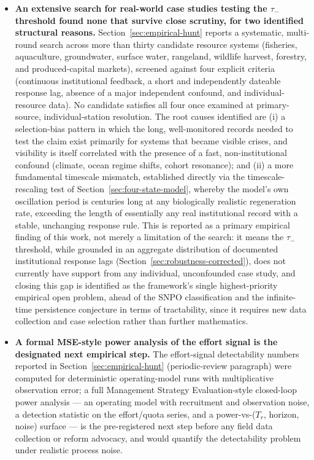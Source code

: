 \documentclass[twocolumn,10pt]{article}
\begin{document}
\begin{itemize}
\item \textbf{An extensive search for real-world case studies testing the $\tau_-$ threshold found none that survive close scrutiny, for two identified structural reasons.} Section~\ref{sec:empirical-hunt} reports a systematic, multi-round search across more than thirty candidate resource systems (fisheries, aquaculture, groundwater, surface water, rangeland, wildlife harvest, forestry, and produced-capital markets), screened against four explicit criteria (continuous institutional feedback, a short and independently dateable response lag, absence of a major independent confound, and individual-resource data). No candidate satisfies all four once examined at primary-source, individual-station resolution. The root causes identified are (i) a selection-bias pattern in which the long, well-monitored records needed to test the claim exist primarily for systems that became visible crises, and visibility is itself correlated with the presence of a fast, non-institutional confound (climate, ocean regime shifts, cohort resonance); and (ii) a more fundamental timescale mismatch, established directly via the timescale-rescaling test of Section~\ref{sec:four-state-model}, whereby the model's own oscillation period is centuries long at any biologically realistic regeneration rate, exceeding the length of essentially any real institutional record with a stable, unchanging response rule. This is reported as a primary empirical finding of this work, not merely a limitation of the search: it means the $\tau_-$ threshold, while grounded in an aggregate distribution of documented institutional response lags (Section~\ref{sec:robustness-corrected}), does not currently have support from any individual, unconfounded case study, and closing this gap is identified as the framework's single highest-priority empirical open problem, ahead of the SNPO classification and the infinite-time persistence conjecture in terms of tractability, since it requires new data collection and case selection rather than further mathematics.
\item \textbf{A formal MSE-style power analysis of the effort signal is the designated next empirical step.} The effort-signal detectability numbers reported in Section~\ref{sec:empirical-hunt} (periodic-review paragraph) were computed for deterministic operating-model runs with multiplicative observation error; a full Management Strategy Evaluation-style closed-loop power analysis --- an operating model with recruitment and observation noise, a detection statistic on the effort/quota series, and a power-vs-($T_r$, horizon, noise) surface --- is the pre-registered next step before any field data collection or reform advocacy, and would quantify the detectability problem under realistic process noise.
\end{itemize}
\end{document}
